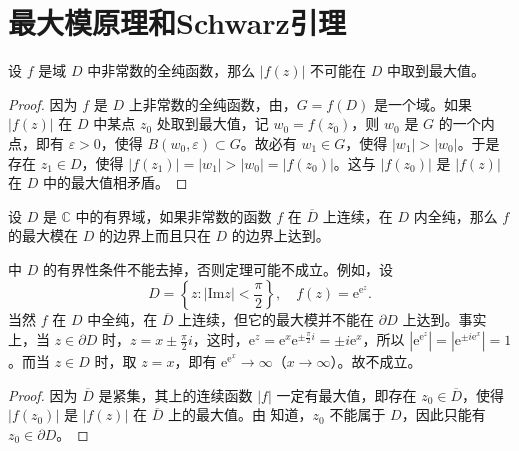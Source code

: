 \documentclass[../../main.tex]{subfiles}
\begin{document}
\section{最大模原理和Schwarz引理}

\begin{theorem}[最大模原理]\label{theorem:最大模原理-定理4.5.1}
设 \( f \) 是域 \( D \) 中非常数的全纯函数，那么 \( |f(z)| \) 不可能在 \( D \) 中取到最大值。
\end{theorem}
\begin{proof}
因为 \( f \) 是 \( D \) 上非常数的全纯函数，由，\( G = f(D) \) 是一个域。如果 \( |f(z)| \) 在 \( D \) 中某点 \( z_0 \) 处取到最大值，记 \( w_0 = f(z_0) \)，则 \( w_0 \) 是 \( G \) 的一个内点，即有 \( \varepsilon > 0 \)，使得 \( B(w_0, \varepsilon) \subset G \)。故必有 \( w_1 \in G \)，使得 \( |w_1| > |w_0| \)。于是存在 \( z_1 \in D \)，使得 \( |f(z_1)| = |w_1| > |w_0| = |f(z_0)| \)。这与 \( |f(z_0)| \) 是 \( |f(z)| \) 在 \( D \) 中的最大值相矛盾。 

\end{proof}

\begin{theorem}\label{theorem:定理4.5.2}
设 \( D \) 是 \( \mathbb{C} \) 中的有界域，如果非常数的函数 \( f \) 在 \( \overline{D} \) 上连续，在 \( D \) 内全纯，那么 \( f \) 的最大模在 \( D \) 的边界上而且只在 \( D \) 的边界上达到。
\end{theorem}
\begin{remark}
中 \( D \) 的有界性条件不能去掉，否则定理可能不成立。例如，设
\[
D = \left\{ z : |\text{Im} z| < \frac{\pi}{2} \right\},
\quad
f(z) = \mathrm{e}^{\mathrm{e}^z}.
\]
当然 \( f \) 在 \( D \) 中全纯，在 \( \overline{D} \) 上连续，但它的最大模并不能在 \( \partial D \) 上达到。事实上，当 \( z \in \partial D \) 时，\( z = x \pm \frac{\pi}{2}i \)，这时，\( \mathrm{e}^z = \mathrm{e}^x \mathrm{e}^{\pm \frac{\pi}{2}i} = \pm i\mathrm{e}^x \)，所以 \( |\mathrm{e}^{\mathrm{e}^z}| = |\mathrm{e}^{\pm i\mathrm{e}^x}| = 1 \)。而当 \( z \in D \) 时，取 \( z = x \)，即有 \( \mathrm{e}^{\mathrm{e}^x} \to \infty \)（\( x \to \infty \)）。故不成立。
\end{remark}
\begin{proof}
因为 \( \overline{D} \) 是紧集，其上的连续函数 \( |f| \) 一定有最大值，即存在 \( z_0 \in \overline{D} \)，使得 \( |f(z_0)| \) 是 \( |f(z)| \) 在 \( \overline{D} \) 上的最大值。由 知道，\( z_0 \) 不能属于 \( D \)，因此只能有 \( z_0 \in \partial D \)。 

\end{proof}
\end{document}
